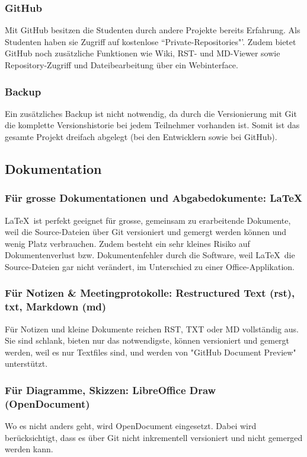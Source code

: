 \subsubsection{GitHub}
Mit GitHub besitzen die Studenten durch andere Projekte bereits Erfahrung. Als
Studenten haben sie Zugriff auf kostenlose ``Private-Repositories"'. Zudem
bietet GitHub noch zusätzliche Funktionen wie Wiki, RST- und MD-Viewer sowie
Repository-Zugriff und Dateibearbeitung über ein Webinterface.

\subsubsection{Backup}
Ein zusätzliches Backup ist nicht notwendig, da durch die Versionierung mit Git die komplette Versionshistorie bei jedem Teilnehmer vorhanden ist. Somit ist das gesamte Projekt dreifach abgelegt (bei den Entwicklern sowie bei GitHub).


\subsection{Dokumentation}
\subsubsection{Für grosse Dokumentationen und Abgabedokumente: \LaTeX}
\LaTeX\ ist perfekt geeignet für grosse, gemeinsam zu erarbeitende Dokumente,
weil die Source-Dateien über Git versioniert und gemergt werden können und wenig
Platz verbrauchen. Zudem besteht ein sehr kleines Risiko auf Dokumentenverlust
bzw. Dokumentenfehler durch die Software, weil \LaTeX\ die Source-Dateien gar
nicht verändert, im Unterschied zu einer Office-Applikation.

\subsubsection{Für Notizen \& Meetingprotokolle: Restructured Text (rst), txt, Markdown (md)}
Für Notizen und kleine Dokumente reichen RST, TXT oder MD vollständig aus. Sie
sind schlank, bieten nur das notwendigste, können versioniert und gemergt
werden, weil es nur Textfiles sind, und werden von "GitHub Document Preview" unterstützt.

\subsubsection{Für Diagramme, Skizzen: LibreOffice Draw (OpenDocument)}
Wo es nicht anders geht, wird OpenDocument eingesetzt. Dabei wird
berücksichtigt, dass es über Git nicht inkrementell versioniert und nicht
gemerged werden kann.


